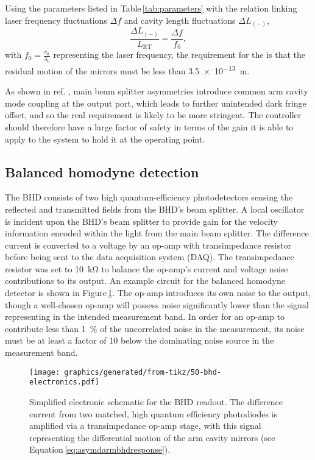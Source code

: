 Using the parameters listed in Table\,\ref{tab:parameters} with the relation linking laser frequency fluctuations $\Delta f$ and cavity length fluctuations $\Delta L_{\left(-\right)}$,
\begin{equation}
  \frac{\Delta L_{\left(-\right)}}{L_{\textrm{RT}}} = \frac{\Delta f}{f_{0}},
\end{equation}
with $f_{0} = \frac{c_{0}}{\lambda_{0}}$ representing the laser frequency, the requirement for the \SSM{} is that the residual motion of the mirrors must be less than \SI{3.5e-13}{\meter}.

As shown in ref. \cite{Danilishin2015}, main beam splitter asymmetries introduce common arm cavity mode coupling at the output port, which leads to further unintended dark fringe offset, and so the real requirement is likely to be more stringent. The controller should therefore have a large factor of safety in terms of the gain it is able to apply to the system to hold it at the operating point.

\subsection{\label{sec:bhd}Balanced homodyne detection}
     
The \gls{BHD} consists of two high quantum-efficiency photodetectors sensing the reflected and transmitted fields from the \gls{BHD}'s beam splitter. A local oscillator is incident upon the \gls{BHD}'s beam splitter to provide gain for the velocity information encoded within the light from the main beam splitter. The difference current is converted to a voltage by an op-amp with transimpedance resistor \RT{} before being sent to the data acquisition system (\gls{DAQ}). The transimpedance resistor was set to \SI{10}{\kilo\ohm} to balance the op-amp's current and voltage noise contributions to its output. An example circuit for the balanced homodyne detector is shown in Figure\,\ref{fig:bhd-electronics}. The op-amp introduces its own noise to the output, though a well-chosen op-amp will possess noise significantly lower than the signal representing \LMINUS{} in the intended measurement band. In order for an op-amp to contribute less than \SI{1}{\percent} of the uncorrelated noise in the measurement, its noise must be at least a factor of \SI{10}{} below the dominating noise source in the measurement band.

\begin{figure}
  \centering
  \texttt{[image: graphics/generated/from-tikz/50-bhd-electronics.pdf]}
  \caption[Electronic schematic for the balanced homodyne readout]{\label{fig:bhd-electronics}Simplified electronic schematic for the BHD readout. The difference current from two matched, high quantum efficiency photodiodes is amplified via a transimpedance op-amp stage, with this signal representing the differential motion of the arm cavity mirrors (see Equation\,\ref{eq:asymdarmbhdresponse}).}
\end{figure}


